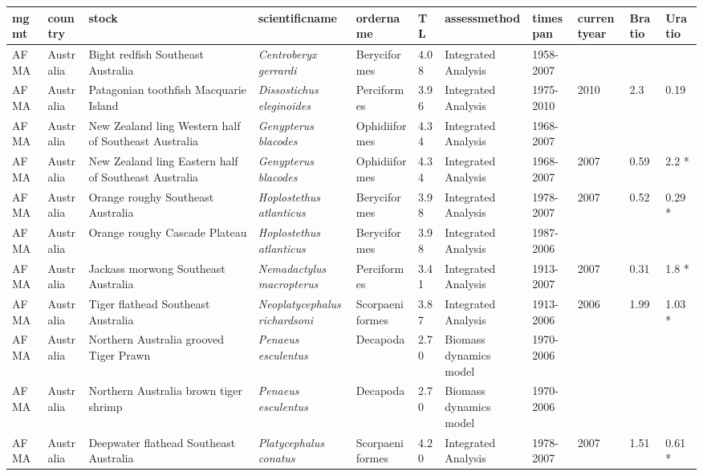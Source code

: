 \begin{longtable}{p{1.5cm}p{1.5cm}p{3cm}p{3cm}p{2.5cm}p{0.9cm}p{1.4cm}p{0.9cm}p{0.9cm}p{0.9cm}p{1cm}}
  \hline
mgmt & country & stock & scientificname & ordername & TL & assessmethod & timespan & currentyear & Bratio & Uratio \\ 
  \hline
AFMA & Australia & Bight redfish Southeast Australia & \textit{Centroberyx gerrardi} & Beryciformes & 4.08 & Integrated Analysis & 1958-2007 &  &  &  \\ 
  AFMA & Australia & Patagonian toothfish Macquarie Island & \textit{Dissostichus eleginoides} & Perciformes & 3.96 & Integrated Analysis & 1975-2010 & 2010 & 2.3 & 0.19 \\ 
  AFMA & Australia & New Zealand ling Western half of Southeast Australia & \textit{Genypterus blacodes} & Ophidiiformes & 4.34 & Integrated Analysis & 1968-2007 &  &  &  \\ 
  AFMA & Australia & New Zealand ling Eastern half of Southeast Australia & \textit{Genypterus blacodes} & Ophidiiformes & 4.34 & Integrated Analysis & 1968-2007 & 2007 & 0.59 & 2.2 * \\ 
  AFMA & Australia & Orange roughy Southeast Australia & \textit{Hoplostethus atlanticus} & Beryciformes & 3.98 & Integrated Analysis & 1978-2007 & 2007 & 0.52 & 0.29 * \\ 
  AFMA & Australia & Orange roughy Cascade Plateau & \textit{Hoplostethus atlanticus} & Beryciformes & 3.98 & Integrated Analysis & 1987-2006 &  &  &  \\ 
  AFMA & Australia & Jackass morwong Southeast Australia & \textit{Nemadactylus macropterus} & Perciformes & 3.41 & Integrated Analysis & 1913-2007 & 2007 & 0.31 & 1.8 * \\ 
  AFMA & Australia & Tiger flathead Southeast Australia & \textit{Neoplatycephalus richardsoni} & Scorpaeniformes & 3.87 & Integrated Analysis & 1913-2006 & 2006 & 1.99 & 1.03 * \\ 
  AFMA & Australia & Northern Australia grooved Tiger Prawn & \textit{Penaeus esculentus} & Decapoda & 2.70 & Biomass dynamics model & 1970-2006 &  &  &  \\ 
  AFMA & Australia & Northern Australia brown tiger shrimp & \textit{Penaeus esculentus} & Decapoda & 2.70 & Biomass dynamics model & 1970-2006 &  &  &  \\ 
  AFMA & Australia & Deepwater flathead Southeast Australia & \textit{Platycephalus conatus} & Scorpaeniformes & 4.20 & Integrated Analysis & 1978-2007 & 2007 & 1.51 & 0.61 * \\ 

\end{longtable}
